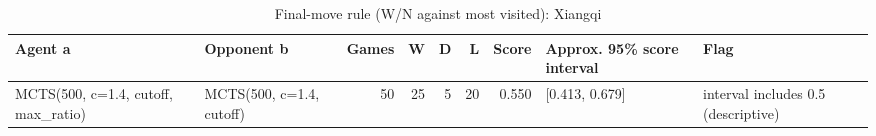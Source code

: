 \begin{table}[!t]
\centering
\caption{Final-move rule (W/N against most visited): Xiangqi}
\label{tab:final_xiangqi}
\small
\begin{tabular}{llrrrrrll}
\toprule
Agent a & Opponent b & Games & W & D & L & Score & Approx. 95\% score interval & Flag \\
\midrule
MCTS(500, c=1.4, cutoff, max\_ratio) & MCTS(500, c=1.4, cutoff) & 50 & 25 & 5 & 20 & 0.550 & [0.413, 0.679] & interval includes 0.5 (descriptive) \\
\bottomrule
\end{tabular}
\end{table}
